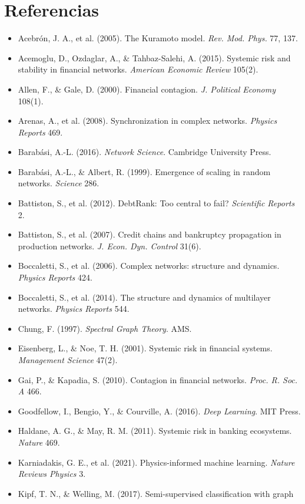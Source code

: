 \chapter{Referencias}
\begin{itemize}[leftmargin=*]
\item Acebrón, J. A., et al. (2005). The Kuramoto model. \emph{Rev. Mod. Phys.} 77, 137.
\item Acemoglu, D., Ozdaglar, A., \& Tahbaz-Salehi, A. (2015). Systemic risk and
stability in financial networks. \emph{American Economic Review} 105(2).
\item Allen, F., \& Gale, D. (2000). Financial contagion. \emph{J. Political Economy} 108(1).
\item Arenas, A., et al. (2008). Synchronization in complex networks. \emph{Physics Reports} 469.
\item Barabási, A.-L. (2016). \emph{Network Science}. Cambridge University Press.
\item Barabási, A.-L., \& Albert, R. (1999). Emergence of scaling in random networks.
\emph{Science} 286.
\item Battiston, S., et al. (2012). DebtRank: Too central to fail? \emph{Scientific Reports} 2.
\item Battiston, S., et al. (2007). Credit chains and bankruptcy propagation in
production networks. \emph{J. Econ. Dyn. Control} 31(6).
\item Boccaletti, S., et al. (2006). Complex networks: structure and dynamics.
\emph{Physics Reports} 424.
\item Boccaletti, S., et al. (2014). The structure and dynamics of multilayer
networks. \emph{Physics Reports} 544.
\item Chung, F. (1997). \emph{Spectral Graph Theory}. AMS.
\item Eisenberg, L., \& Noe, T. H. (2001). Systemic risk in financial systems.
\emph{Management Science} 47(2).
\item Gai, P., \& Kapadia, S. (2010). Contagion in financial networks. \emph{Proc. R. Soc. A} 466.
\item Goodfellow, I., Bengio, Y., \& Courville, A. (2016). \emph{Deep Learning}. MIT Press.
\item Haldane, A. G., \& May, R. M. (2011). Systemic risk in banking ecosystems.
\emph{Nature} 469.
\item Karniadakis, G. E., et al. (2021). Physics-informed machine learning.
\emph{Nature Reviews Physics} 3.
\item Kipf, T. N., \& Welling, M. (2017). Semi-supervised classification with graph

\end{itemize}
